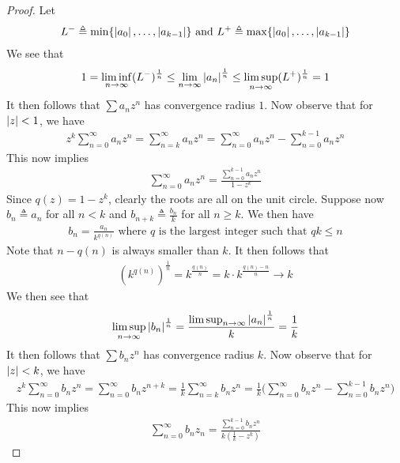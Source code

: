 \documentclass{report}
\begin{document}
\begin{proof}
Let 
\begin{align*}
L^-\triangleq \min \{ \left|a_0\right|,\dots ,\left|a_{k-1}\right| \}\text{ and }L^+\triangleq \max \{ \left|a_0\right|,\dots ,\left|a_{k-1}\right| \}
\end{align*}
We see that 
\begin{align*}
1=\liminf_{n\to\infty} (L^-)^{\frac{1}{n}}\leq \lim_{n\to \infty} \left|a_n\right|^{\frac{1}{n}}\leq \limsup_{n\to\infty} (L^+)^{\frac{1}{n}}=1
\end{align*}
It then follows that $\sum a_nz^n$ has convergence radius $1$. Now observe that for $\left|z\right|<1$, we have 
\begin{align*}
z^k \sum_{n=0}^{\infty}a_nz^n=\sum_{n=k}^{\infty}a_nz^n=\sum_{n=0}^{\infty}a_nz^n - \sum_{n=0}^{k-1}a_nz^n
\end{align*}
This now implies 
\begin{align*}
\sum_{n=0}^{\infty}a_nz^n= \frac{\sum_{n=0}^{k-1}a_nz^n}{1-z^k}
\end{align*}
Since $q(z)=1-z^k$, clearly the roots are all on the unit circle. Suppose now $b_n\triangleq a_n$ for all $n<k$ and  $b_{n+k}\triangleq \frac{b_n}{k}$ for all $n\geq k$. We then have 
\begin{align*}
  b_n= \frac{a_n}{k^{q(n)}}\text{ where }q\text{ is the largest integer such that }qk\leq n
\end{align*}
Note that $n-q(n)$ is always smaller than $k$. It then follows that 
 \begin{align*}
   (k^{q(n)})^{\frac{1}{n}}= k^{\frac{q(n)}{n}}= k \cdot k^{\frac{q(n)-n}{n}}\to k
\end{align*}
We then see that 
\begin{align*}
\limsup_{n\to\infty} \left|b_n\right|^{\frac{1}{n}}= \frac{\limsup_{n\to\infty} \left|a_n\right|^{\frac{1}{n}}}{k}=\frac{1}{k}
\end{align*}
It then follows that $\sum b_nz^n$ has convergence radius $k$. Now observe that for $\left|z\right|<k$, we have 
\begin{align*}
z^k \sum_{n=0}^{\infty}b_nz^n = \sum_{n=0}^{\infty}b_nz^{n+k}=\frac{1}{k}\sum_{n=k}^{\infty} b_nz^{n}=\frac{1}{k}\Big(\sum_{n=0}^{\infty}b_nz^n - \sum_{n=0}^{k-1}b_nz^n \Big)
\end{align*}
This now implies 
\begin{align*}
\sum_{n=0}^{\infty}b_nz_n= \frac{\sum_{n=0}^{k-1}b_nz^n}{k(\frac{1}{k}-z^k)}
\end{align*}
\end{proof}
\end{document}
